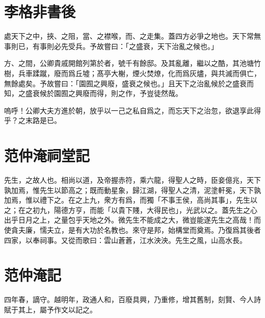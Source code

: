 \section[書洛陽名園記後\quad{\small 李格非}]{{\normalsize 李格非}\quad 書後}
處天下之中，挾、之阻，當、之襟喉，而、之走集。蓋四方必爭之地也。天下常無事則已，有事則必先受兵。予故嘗曰：「之盛衰，天下治亂之候也。」

{方}、之間，公卿貴戚開館列第於者，號千有餘邸。及其亂離，繼以之酷，其池塘竹樹，兵車蹂蹴，廢而爲丘墟；髙亭大榭，煙火焚燎，化而爲灰燼，與共滅而俱亡，無餘處矣。予故嘗曰：「園囿之興廢，盛衰之候也。」且天下之治亂候於之盛衰而知，之盛衰候於園囿之興廢而得，則之作，予豈徒然哉。%

嗚呼！公卿大夫方進於朝，放乎以一己之私自爲之，而忘天下之治忽，欲退享此得乎？之末路是已。

\section[嚴先生祠堂記\quad{\small 范仲淹}]{{\normalsize 范仲淹}\quad {}祠堂記}
先生，之故人也。相尚以道，及帝握赤符，乘六龍，得聖人之時，臣妾億兆，天下孰加焉，惟先生以節高之；既而動星象，歸江湖，得聖人之清，泥塗軒冕，天下孰加焉，惟以禮下之。在之上九，衆方有爲，而獨「不事王侯，高尚其事」，先生以之；在之初九，陽德方亨，而能「以貴下賤，大得民也」，光武以之。蓋先生之心出乎日月之上，之量包乎天地之外。微先生不能成之大，微豈能遂先生之高哉！而使貪夫廉，懦夫立，是有大功於名教也。來守是邦，始構堂而奠焉。乃復爲其後者四家，以奉祠事。又從而歌曰：雲山蒼蒼，江水泱泱。先生之風，山高水長。

\section[岳陽樓記\quad{\small 范仲淹}]{{\normalsize 范仲淹}\quad {}記}
四年春，謫守。越明年，政通人和，百廢具興，乃重修，增其舊制，刻賢、今人詩賦于其上，屬予作文以記之。

